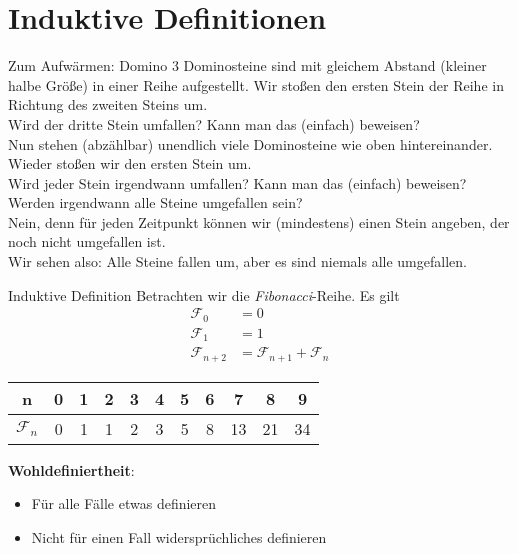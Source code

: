 \section{Induktive Definitionen}

\begin{frame}{Zum Aufwärmen: Domino}
	3 Dominosteine sind mit gleichem Abstand (kleiner halbe Größe) in einer Reihe aufgestellt. Wir stoßen den ersten Stein der Reihe in Richtung des zweiten Steins um. \\
	Wird der dritte Stein umfallen? Kann man das (einfach) beweisen? \\[1em]
	\pause
	Nun stehen (abzählbar) unendlich viele Dominosteine wie oben hintereinander. Wieder stoßen wir den ersten Stein um. \\
	Wird jeder Stein irgendwann umfallen? Kann man das (einfach) beweisen? \\[1em]
	\pause
	Werden irgendwann alle Steine umgefallen sein? \\
	\pause Nein, denn für jeden Zeitpunkt können wir (mindestens) einen Stein angeben, der noch nicht umgefallen ist.\\
	Wir sehen also: Alle Steine fallen um, aber es sind niemals alle umgefallen.
\end{frame}

\begin{frame}{Induktive Definition}
	Betrachten wir die \emph{Fibonacci}-Reihe.
	Es gilt 
	\begin{align*}
		\mathcal{F}_{0} &= 0 \\
		\mathcal{F}_1 &= 1 \\
		\mathcal{F}_{n+2} &= \mathcal{F}_{n+1} + \mathcal{F}_n 		
	\end{align*}
	\pause
	\begin{table}
		\centering
		\begin{tabular}{|c|c|c|c|c|c|c|c|c|c|c|}
		\hline
		n & 0 & 1 & 2 & 3 & 4 & 5 & 6 & 7 & 8 & 9 \\ \hline
		$\mathcal{F}_n$ & 0 & 1 & 1 & 2 & 3 & 5 & 8 & 13 & 21 & 34 \\ \hline
		\end{tabular}
	\end{table}

	\pause
	\textbf{Wohldefiniertheit}: 
	\begin{itemize}
		\item Für alle Fälle etwas definieren 
		\item Nicht für einen Fall widersprüchliches definieren
	\end{itemize}
\end{frame}

